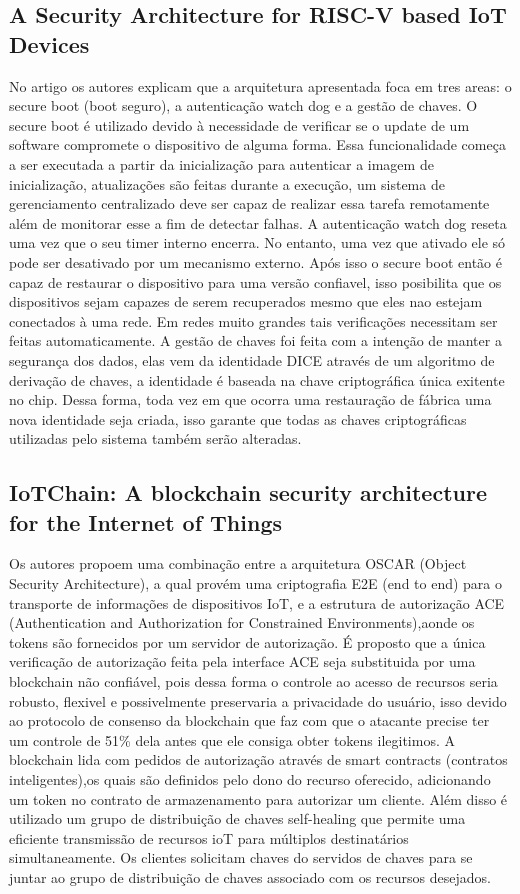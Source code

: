 \documentclass[article]{abntex2}
\begin{document}
\subsection{A Security Architecture for RISC-V based IoT Devices}%
No artigo os autores explicam que a arquitetura apresentada foca em tres areas: o secure boot (boot seguro), a autenticação watch dog e a gestão de chaves. O secure boot é utilizado devido à necessidade de verificar se o update de um software compromete o dispositivo de alguma forma. Essa funcionalidade começa a ser executada a partir da inicialização para autenticar a imagem de inicialização, atualizações são feitas durante a execução, um sistema de gerenciamento centralizado deve ser capaz de realizar essa tarefa remotamente além de monitorar esse a fim de detectar falhas. A autenticação watch dog reseta uma vez que o seu timer interno encerra. No entanto, uma vez que ativado ele só pode ser desativado por um mecanismo externo. Após isso o secure boot então é capaz de restaurar o dispositivo para uma versão confiavel, isso posibilita que os dispositivos sejam capazes de serem recuperados mesmo que eles nao estejam conectados à uma rede. Em redes muito grandes tais verificações necessitam ser feitas automaticamente. A gestão de chaves foi feita com a intenção de manter a segurança dos dados, elas vem da identidade DICE através de um algoritmo de derivação de chaves, a identidade é baseada na chave criptográfica única exitente no chip. Dessa forma, toda vez em que ocorra uma restauração de fábrica uma nova identidade seja criada, isso garante que todas as chaves criptográficas utilizadas pelo sistema também serão alteradas.

\subsection{IoTChain: A blockchain security architecture for the Internet of Things}%
Os autores propoem  uma combinação entre a arquitetura OSCAR (Object Security Architecture), a qual provém uma criptografia E2E (end to end) para o transporte de informações de dispositivos IoT, e a estrutura de autorização ACE (Authentication and Authorization for Constrained Environments),aonde os tokens são fornecidos por um servidor de autorização. É proposto que a única verificação de autorização feita pela interface ACE seja substituida por uma blockchain não confiável, pois dessa forma o controle ao acesso de recursos seria robusto, flexivel e possivelmente preservaria a privacidade do usuário, isso devido ao protocolo de consenso da blockchain que faz com que o atacante precise ter um controle de 51\% dela antes que ele consiga obter tokens ilegitimos. A blockchain lida com pedidos de autorização através de smart contracts (contratos inteligentes),os quais são definidos pelo dono do recurso oferecido, adicionando um token no contrato de armazenamento para autorizar um cliente. Além disso é utilizado um grupo de distribuição de chaves self-healing que permite uma eficiente transmissão de recursos ioT para múltiplos destinatários simultaneamente. Os clientes solicitam chaves do servidos de chaves para se juntar ao grupo de distribuição de chaves associado com os recursos desejados.
\end{document}
